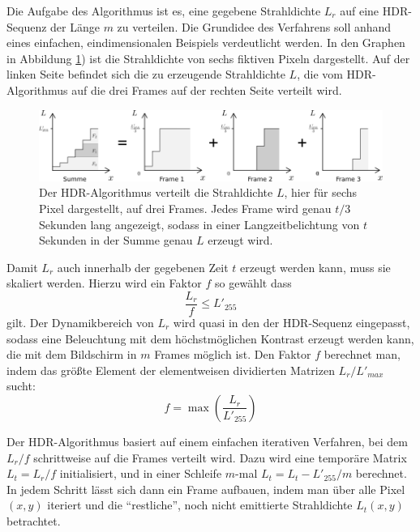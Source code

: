     Die Aufgabe des Algorithmus ist es, eine gegebene Strahldichte $L_r$ auf eine HDR-Sequenz der Länge $m$ zu verteilen. 
    Die Grundidee des Verfahrens soll anhand eines einfachen, eindimensionalen Beispiels verdeutlicht werden.
    In den Graphen in Abbildung \ref{fig:hdr_graph_example}) ist die Strahldichte von sechs fiktiven Pixeln dargestellt.
    Auf der linken Seite befindet sich die zu erzeugende Strahldichte $L$, die vom HDR-Algorithmus auf die drei Frames auf der rechten Seite verteilt wird. 

   \begin{figure}[h]
    \centering
    \includegraphics[width=\textwidth]{../graphics/beleuchtung/hdr_sequence_example.svg}
    \caption[1D-Beispiel einer HDR-Sequenz]{Der HDR-Algorithmus verteilt die Strahldichte $L$, hier für sechs Pixel dargestellt, auf drei Frames. Jedes Frame wird genau $t/3$ Sekunden lang angezeigt, sodass in einer Langzeitbelichtung von $t$ Sekunden in der Summe genau $L$ erzeugt wird.
     }
    \label{fig:hdr_graph_example}
   \end{figure}
  
   Damit $L_r$ auch innerhalb der gegebenen Zeit $t$ erzeugt werden kann, muss sie skaliert werden.
   Hierzu wird ein Faktor $f$ so gewählt dass 
    \begin{equation}
      \frac{L_{r}}{f} \le L'_{255}
    \end{equation}
    gilt.
    Der Dynamikbereich von $L_{r}$ wird quasi in den der HDR-Sequenz eingepasst, sodass eine Beleuchtung mit dem höchstmöglichen Kontrast erzeugt werden kann, die mit dem Bildschirm in  $m$ Frames möglich ist.
    Den Faktor $f$ berechnet man, indem das größte Element der elementweisen dividierten Matrizen $L_{r}/L'_{max}$ sucht:
    \begin{equation}
      f=\max{(\frac{L_{r}}{L'_{255}})}
    \end{equation}


    Der HDR-Algorithmus basiert auf einem einfachen iterativen Verfahren, bei dem $L_r/{f}$ schrittweise auf die Frames verteilt wird.
    Dazu wird eine temporäre Matrix $L_t=L_{r}/f$ initialisiert, und in einer Schleife $m$-mal $L_t=L_t-L'_{255}/m$ berechnet. 
    In jedem Schritt lässt sich dann ein Frame aufbauen, indem man über alle Pixel $(x,y)$ iteriert und die ``restliche'', noch nicht emittierte Strahldichte  $L_t(x,y)$ betrachtet.

